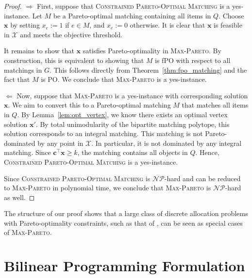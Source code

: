 \documentclass[a4paper, 11pt]{article}
\newcommand{\mc}{\mathcal}
\begin{document}
\begin{proof}
$\Rightarrow$ First, suppose that \textsc{Constrained Pareto-Optimal Matching} is a yes-instance. Let $M$ be a Pareto-optimal matching containing all items in $Q$. Choose $\bm{x}$ by setting $x_{e} := 1$ if $e \in M$, and $x_e := 0$ otherwise. It is clear that $\bm{x}$ is feasible in $\mc{X}$ and meets the objective threshold. 

It remains to show that $\bm{x}$ satisfies Pareto-optimality in \textsc{Max-Pareto}. By construction, this is equivalent to showing that $M$ is fPO with respect to all matchings in $G$. This follows directly from Theorem~\ref{thm:fpo_matching} and the fact that $M$ is PO. We conclude that \textsc{Max-Pareto} is a yes-instance.

$\Leftarrow$ Now, suppose that \textsc{Max-Pareto} is a yes-instance with corresponding solution $\bm{x}$. We aim to convert this to a Pareto-optimal matching $M$ that matches all items in $Q$. By Lemma~\ref{lem:opt_vertex}, we know there exists an optimal vertex solution $\bm{x}'$. By total unimodularity of the bipartite matching polytope, this solution corresponds to an integral matching. This matching is not Pareto-dominated by any point in $\mc{X}$. In particular, it is not dominated by any integral matching. Since $\bm{c}^\top \bm{x} \geq k$, the matching contains all objects in $Q$. Hence, \textsc{Constrained Pareto-Optimal Matching} is a yes-instance.  

Since \textsc{Constrained Pareto-Optimal Matching} is $\mc{NP}$-hard and can be reduced to \textsc{Max-Pareto} in polynomial time, we conclude that \textsc{Max-Pareto} is $\mc{NP}$-hard as well.
\end{proof}
The structure of our proof shows that a large class of discrete allocation problems with Pareto-optimality constraints, such as that of \citep{biro2021complexity}, can be seen as special cases of \textsc{Max-Pareto}.

\section{Bilinear Programming Formulation}
\label{sec:formulation}
\end{document}
